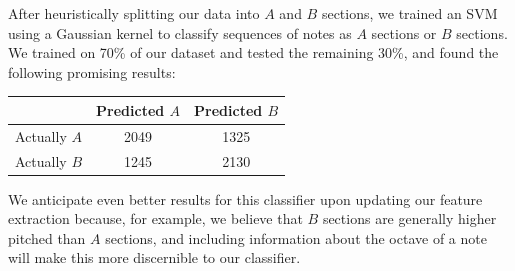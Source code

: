 \documentclass{article} %
\begin{document}
After heuristically splitting our data into $A$ and $B$ sections, we trained
an SVM using a Gaussian kernel to classify sequences of notes as $A$ sections
or $B$ sections. We trained on 70\% of our dataset and tested the remaining 
30\%, and found the following promising results:

\begin{center}
\begin{tabular}{c|cc}
             & Predicted $A$ & Predicted $B$ \\ \hline
Actually $A$ & 2049          & 1325          \\
Actually $B$ & 1245          & 2130
\end{tabular}
\end{center}

We anticipate even better results for this classifier upon updating our
feature extraction because, for example, we believe that $B$ sections are
generally higher pitched than $A$ sections, and including information about
the octave of a note will make this more discernible to our classifier.
\end{document}
